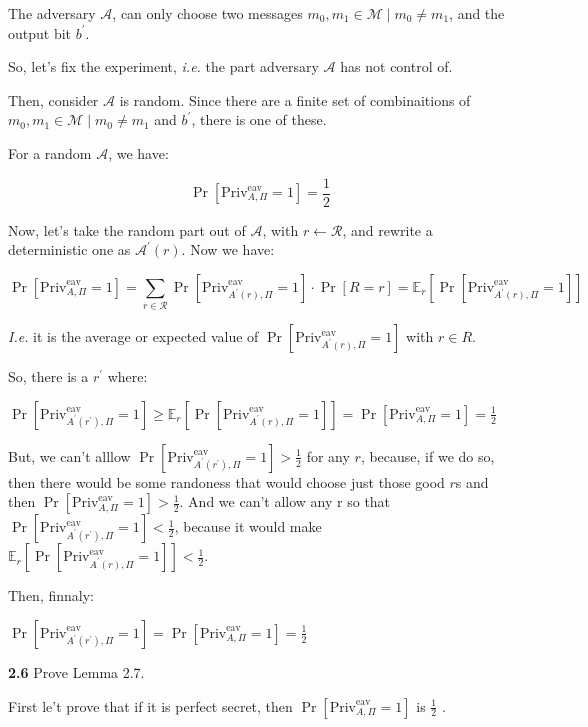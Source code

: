 The adversary $\mathcal{A}$, can only choose two messages $m_0, m_1 \in \mathcal{M} \mid m_0 \ne m_1$, and the output bit $b^\prime$.

So, let's fix the experiment, \textit{i.e.} the part adversary $\mathcal{A}$ has not control of.

Then, consider $\mathcal{A}$ is random. Since there are a finite set of combinaitions of  $m_0, m_1 \in \mathcal{M} \mid m_0 \ne m_1$ and $b^\prime$, there is one of these.

For a random $\mathcal{A}$, we have:

\[
\Pr[\text{Priv}^{\text{eav}}_{A, \Pi} = 1] = \frac{1}{2}
\]

Now, let's take the random part out of $\mathcal{A}$, with  $r \leftarrow \mathcal{R}$, and rewrite a deterministic one as  $\mathcal{A}^\prime(r)$. Now we have:

\[
\Pr[\text{Priv}^{\text{eav}}_{A, \Pi} = 1] = \sum_{r \in \mathcal{R}} \Pr[\text{Priv}^{\text{eav}}_{A^\prime(r), \Pi} = 1] \cdot \Pr[R = r] = \mathbb{E}_r[\Pr[\text{Priv}^{\text{eav}}_{A^\prime(r), \Pi} = 1]]
\]

\textit{I.e.} it is the average or expected value of $\Pr[\text{Priv}^{\text{eav}}_{A^\prime(r), \Pi} = 1]$ with $r \in R$.

So, there is a $r^\prime$ where:

$\Pr[\text{Priv}^{\text{eav}}_{A^\prime(r^\prime), \Pi} = 1] \ge \mathbb{E}_r[\Pr[\text{Priv}^{\text{eav}}_{A^\prime(r), \Pi} = 1]] = \Pr[\text{Priv}^{\text{eav}}_{A, \Pi} = 1] = \frac{1}{2}$


But, we can't alllow $\Pr[\text{Priv}^{\text{eav}}_{A^\prime(r^\prime), \Pi} = 1] > \frac{1}{2}$ for any $r$, because, if we do so, then there would be some randoness that would choose just those good $r$s and then $\Pr[\text{Priv}^{\text{eav}}_{A, \Pi} = 1] > \frac{1}{2}$. And we can't allow any r so that  $\Pr[\text{Priv}^{\text{eav}}_{A^\prime(r^\prime), \Pi} = 1] < \frac{1}{2}$, because it would make $ \mathbb{E}_r[\Pr[\text{Priv}^{\text{eav}}_{A^\prime(r), \Pi} = 1]] < \frac{1}{2}$.

Then, finnaly:

$\Pr[\text{Priv}^{\text{eav}}_{A^\prime(r^\prime), \Pi} = 1] = \Pr[\text{Priv}^{\text{eav}}_{A, \Pi} = 1] = \frac{1}{2}$


\newpage
\noindent
\textbf{2.6} \hspace{1em} Prove Lemma 2.7.
\vspace{1em}

First le't prove that if it is perfect secret, then $\Pr[\text{Priv}^{\text{eav}}_{A, \Pi} = 1]$ is $\frac{1}{2}$ .

